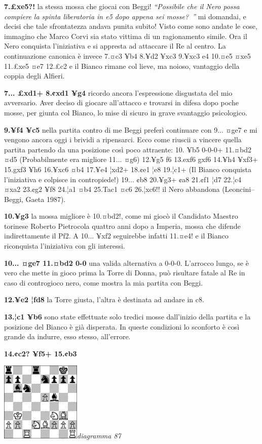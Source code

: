 \documentclass[
]{article}
\begin{document}
\textbf{7.£xe5?!} la stessa mossa che giocai con Beggi!
\emph{``Possibile che il Nero possa compiere la spinta liberatoria in e5
dopo appena sei mosse?~''} mi domandai, e decisi che tale sfrontatezza
andava punita subito! Visto come sono andate le cose, immagino che Marco
Corvi sia stato vittima di un ragionamento simile. Ora il Nero conquista
l'iniziativa e si appresta ad attaccare il Re al centro. La
continuazione canonica è invece 7.¤c3 ¥b4 8.¥d2 ¥xc3 9.¥xc3 e4 10.¤e5
¤xe5 11.£xe5 ¤e7 12.£c2 e il Bianco rimane col lieve, ma noioso,
vantaggio della coppia degli Alfieri.

\textbf{7... £xd1+ 8.¢xd1 ¥g4} ricordo ancora l'espressione disgustata
del mio avversario. Aver deciso di giocare all'attacco e trovarsi in
difesa dopo poche mosse, per giunta col Bianco, lo mise di sicuro in
grave svantaggio psicologico.

\textbf{9.¥f4 ¥c5} nella partita contro di me Beggi preferì continuare
con 9... ¤ge7 e mi vengono ancora oggi i brividi a ripensarci. Ecco come
riuscii a vincere quella partita partendo da una posizione così poco
attraente: 10. ¥b5 0-0-0+ 11.¤bd2 ¤d5 (Probabilmente era migliore 11...
¤g6) 12.¥g5 f6 13.exf6 gxf6 14.¥h4 ¥xf3+ 15.gxf3 ¥h6 16.¥xc6 ¤b4 17.¥e4
¦xd2+ 18.¢e1 ¦e8 19.¦c1+ (Il Bianco conquista l'iniziativa e colpisce in
contropiede!) 19... ¢b8 20.¥g3+ ¢a8 21.¢f1 ¦d7 22.¦c4 ¤xa2 23.¢g2 ¥f8
24.¦a1 ¤b4 25.Tac1 ¤c6 26.¦xc6!! il Nero abbandona (Leoncini--Beggi,
Gaeta 1987).

\textbf{10.¥g3} la mossa migliore è 10.¤bd2!, come mi giocò il Candidato
Maestro torinese Roberto Pietrocola quattro anni dopo a Imperia, mossa
che difende indirettamente il Pf2. A 10... ¥xf2 seguirebbe infatti
11.¤e4! e il Bianco riconquista l'iniziativa con gli interessi.

\textbf{10... ¤ge7 11.¤bd2 0-0} una valida alternativa a 0-0-0.
L'arrocco lungo, se è vero che mette in gioco prima la Torre di Donna,
può risultare fatale al Re in caso di controgioco nero, come mostra la
mia partita con Beggi.

\textbf{12.¥e2 ¦fd8} la Torre giusta, l'altra è destinata ad andare in
c8.

\textbf{13.¦c1 ¥b6} sono state effettuate solo tredici mosse dall'inizio
della partita e la posizione del Bianco è già disperata. In queste
condizioni lo sconforto è così grande da indurre, esso stesso,
all'errore.

\textbf{14.¢c2? ¥f5+ 15.¢b3}

\includegraphics[width=1.5in,height=1.5in]{vertopal_109f12be458a423d8f3cc838880eaea2/media/image87.png}\emph{diagramma
87}
\end{document}
